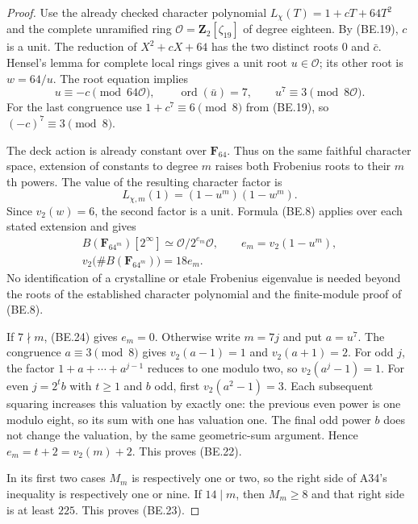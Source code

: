 \begin{proof}
Use the already checked character polynomial
$L_\chi(T)=1+cT+64T^2$ and the complete unramified ring
$\mathcal O=\mathbf Z_2[\zeta_{19}]$ of degree eighteen.
By (BE.19), $c$ is a unit.  The reduction of
$X^2+cX+64$ has the two distinct roots $0$ and $\bar c$.
Hensel's lemma for complete local rings
\cite[Lemma~10.153.9, Tag~\texttt{04GM}]{Stacks04GM}
gives a unit root $u\in\mathcal O$; its other root is
$w=64/u$.  The root equation implies
\[
 u\equiv-c\pmod{64\mathcal O},\qquad
 \operatorname{ord}(\bar u)=7,
 \qquad u^7\equiv3\pmod{8\mathcal O}.                          \tag{BE.24}
\]
For the last congruence use $1+c^7\equiv6\pmod8$ from
(BE.19), so $(-c)^7\equiv3\pmod8$.

The deck action is already constant over $\mathbf F_{64}$.
Thus on the same faithful character space, extension of
constants to degree $m$ raises both Frobenius roots to their
$m$th powers.  The value of the resulting character factor is
\[
           L_{\chi,m}(1)=(1-u^m)(1-w^m).
                                                               \tag{BE.25}
\]
Since $v_2(w)=6$, the second factor is a unit.  Formula
(BE.8) applies over each stated extension and gives
\[
 \begin{gathered}
 B(\mathbf F_{64^m})[2^\infty]\simeq
      \mathcal O/2^{e_m}\mathcal O,
 \qquad e_m=v_2(1-u^m),\\
 v_2\bigl(\#B(\mathbf F_{64^m})\bigr)=18e_m.
 \end{gathered}
                                                               \tag{BE.26}
\]
No identification of a crystalline or etale Frobenius
eigenvalue is needed beyond the roots of the established
character polynomial and the finite-module proof of (BE.8).

If $7\nmid m$, (BE.24) gives $e_m=0$.
Otherwise write $m=7j$ and put $a=u^7$.
The congruence $a\equiv3\pmod8$ gives
$v_2(a-1)=1$ and $v_2(a+1)=2$.
For odd $j$, the factor $1+a+\cdots+a^{j-1}$ reduces to
one modulo two, so $v_2(a^j-1)=1$.
For even $j=2^t b$ with $t\geq1$ and $b$ odd, first
$v_2(a^2-1)=3$.  Each subsequent squaring increases this
valuation by exactly one: the previous even power is one
modulo eight, so its sum with one has valuation one.
The final odd power $b$ does not change the valuation,
by the same geometric-sum argument.  Hence
$e_m=t+2=v_2(m)+2$.  This proves (BE.22).

In its first two cases $M_m$ is respectively one or two,
so the right side of A34's inequality is respectively one
or nine.  If $14\mid m$, then $M_m\geq8$ and that right
side is at least $225$.  This proves (BE.23).
\end{proof}
